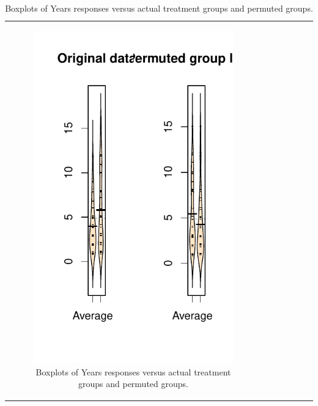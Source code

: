 \documentclass[]{book}
\theoremstyle{definition}
\theoremstyle{definition}
\theoremstyle{remark}
\begin{document}
\begin{longtable}[]{@{}ccccccc@{}}
\begin{minipage}[b]{0.10\columnwidth}
\begin{figure}
\centering
\includegraphics{02-reintroductionToStatistics_files/figure-latex/Figure2-8-1.pdf}
\caption{\label{fig:Figure2-8}Boxplots of Years responses versus actual treatment groups
and permuted groups.}
\end{figure}


\end{minipage}
\end{longtable}
\end{document}

